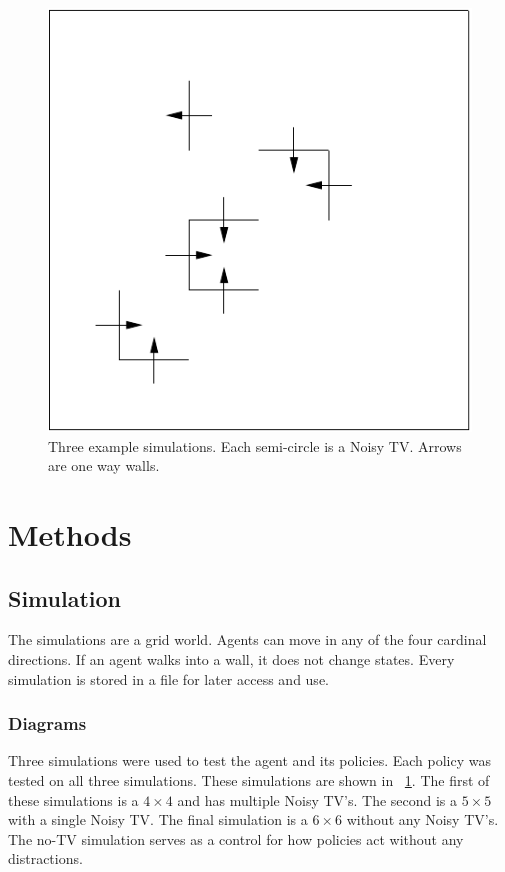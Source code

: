 \documentclass[12pt]{thesis}
\begin{document}
\begin{figure}
\begin{center}
	  \includegraphics[scale=0.75]{"images/No-TV.pdf"}
	\end{center}
	\caption{Three example simulations. Each semi-circle is a Noisy TV. Arrows are one way walls.}
	\label{Fig:Sim}
\end{figure}

\chapter{Methods}
\section{Simulation}
The simulations are a grid world. Agents can move in any of the four cardinal directions. If an agent walks into a wall, it does not change states. Every simulation is stored in a file for later access and use.
\subsection{Diagrams}
Three simulations were used to test the agent and its policies. Each policy was tested on all three simulations. These simulations are shown in \figurename~\ref{Fig:Sim}. The first of these simulations is a $4\times4$ and has multiple Noisy TV's. The second is a $5\times5$ with a single Noisy TV. The final simulation is a $6\times6$ without any Noisy TV's. The no-TV simulation serves as a control for how policies act without any distractions.
\end{document}
